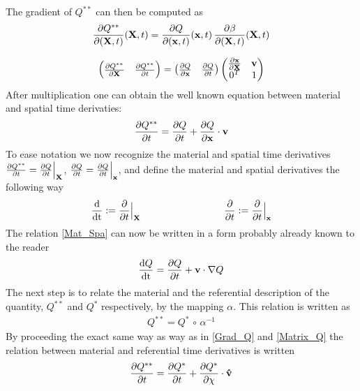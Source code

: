 The gradient of $Q^{**}$ can then be computed as
\begin{align}
\frac{\partial Q^{**}}{\partial (\mathbf{X},t)}(\mathbf{X},t) = \frac{\partial Q}{\partial (\mathbf{x},t)}(\mathbf{x},t) \, \frac{\partial \beta}{\partial (\mathbf{X},t)}(\mathbf{X},t)  \label{Grad_Q}
\end{align}

\begin{align}
	\begin{pmatrix} \frac{\partial Q^{**}}{\partial \mathbf{X}} & \frac{\partial Q^{**}}{\partial t}
	\end{pmatrix}
	= 
	\begin{pmatrix} \frac{\partial Q}{\partial \mathbf{x}} & \frac{\partial Q}{\partial t}
	\end{pmatrix}
	\begin{pmatrix} \frac{\partial \mathbf{x}}{\partial \mathbf{X}} & \mathbf{v} \\
											0^T & 1
	\end{pmatrix} \label{Matrix_Q}
\end{align}
After multiplication one can obtain the well known equation between material and spatial time derivaties:
\begin{align}
\frac{\partial Q^{**}}{\partial t} = \frac{\partial Q}{\partial t} + \frac{\partial Q}{\partial \mathbf{x}} \cdot \mathbf{v} \label{Mat_Spa}
\end{align}
To ease notation we now recognize the material and spatial time derivatives $\frac{\partial Q^{**}}{\partial t} = \frac{\partial Q}{\partial t}\Big{|}_{\mathbf{X}}$, $\frac{\partial Q}{\partial t} = \frac{\partial Q}{\partial t}\Big{|}_{\mathbf{x}}$, and define the material and spatial derivatives the following way
\begin{align}
\frac{\mathrm{d}}{\mathrm{dt}} := \pdi{}{t}\Big{|}_{\mathbf{X}} \hspace{3cm} \pdi{}{t} := \pdi{}{t}\Big{|}_{\mathbf{x}}
\end{align}
The relation \eqref{Mat_Spa} can now be written in a form probably already known to the reader
\begin{align}
\frac{\mathrm{d}Q}{\mathrm{dt}} = \frac{\partial Q}{\partial t} + \mathbf{v} \cdot \nabla Q \label{Material_derivative}
\end{align}
The next step is to relate the material and the referential description of the quantity, $Q^{**}$ and $Q^*$ respectively, by the mapping $\alpha$. This relation is written as 
\begin{align}
Q^{**} = Q^* \, \circ \, \alpha^{-1}
\end{align}
By proceeding the exact same way as way as in \eqref{Grad_Q} and \eqref{Matrix_Q} the relation between material and referential time derivatives is written
\begin{align}
\frac{\partial Q^{**}}{\partial t} = \frac{\partial Q^*}{\partial t} + \frac{\partial Q^*}{\partial \chi}\cdot \mathbf{\hat{v}}
\end{align}
